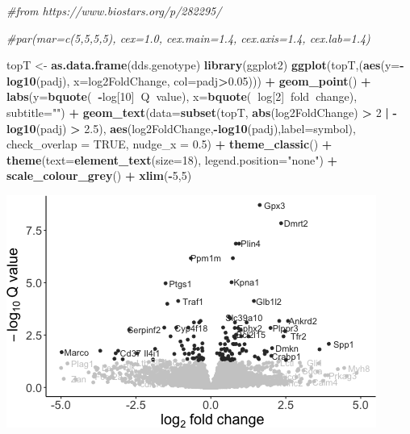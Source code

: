 \documentclass[]{article}
\newenvironment{Shaded}{\begin{snugshade}}{\end{snugshade}}
\newcommand{\CommentTok}[1]{\textcolor[rgb]{0.56,0.35,0.01}{\textit{#1}}}
\newcommand{\DataTypeTok}[1]{\textcolor[rgb]{0.13,0.29,0.53}{#1}}
\newcommand{\DecValTok}[1]{\textcolor[rgb]{0.00,0.00,0.81}{#1}}
\newcommand{\FloatTok}[1]{\textcolor[rgb]{0.00,0.00,0.81}{#1}}
\newcommand{\KeywordTok}[1]{\textcolor[rgb]{0.13,0.29,0.53}{\textbf{#1}}}
\newcommand{\NormalTok}[1]{#1}
\newcommand{\OperatorTok}[1]{\textcolor[rgb]{0.81,0.36,0.00}{\textbf{#1}}}
\newcommand{\OtherTok}[1]{\textcolor[rgb]{0.56,0.35,0.01}{#1}}
\newcommand{\StringTok}[1]{\textcolor[rgb]{0.31,0.60,0.02}{#1}}
\begin{document}
\begin{Shaded}
\begin{Highlighting}[]
\CommentTok{#from https://www.biostars.org/p/282295/}

\CommentTok{#par(mar=c(5,5,5,5), cex=1.0, cex.main=1.4, cex.axis=1.4, cex.lab=1.4)}

\NormalTok{topT <-}\StringTok{ }\KeywordTok{as.data.frame}\NormalTok{(dds.genotype)}
\KeywordTok{library}\NormalTok{(ggplot2)}
\KeywordTok{ggplot}\NormalTok{(topT,(}\KeywordTok{aes}\NormalTok{(}\DataTypeTok{y=}\OperatorTok{-}\KeywordTok{log10}\NormalTok{(padj),}
                \DataTypeTok{x=}\NormalTok{log2FoldChange,}
                \DataTypeTok{col=}\NormalTok{padj}\OperatorTok{>}\FloatTok{0.05}\NormalTok{))) }\OperatorTok{+}
\StringTok{  }\KeywordTok{geom_point}\NormalTok{() }\OperatorTok{+}
\StringTok{  }\KeywordTok{labs}\NormalTok{(}\DataTypeTok{y=}\KeywordTok{bquote}\NormalTok{(}\OperatorTok{~-}\NormalTok{log[}\DecValTok{10}\NormalTok{]}\OperatorTok{~}\NormalTok{Q}\OperatorTok{~}\NormalTok{value),}
       \DataTypeTok{x=}\KeywordTok{bquote}\NormalTok{(}\OperatorTok{~}\NormalTok{log[}\DecValTok{2}\NormalTok{]}\OperatorTok{~}\NormalTok{fold}\OperatorTok{~}\NormalTok{change),}
       \DataTypeTok{subtitle=}\StringTok{""}\NormalTok{) }\OperatorTok{+}
\StringTok{    }\KeywordTok{geom_text}\NormalTok{(}\DataTypeTok{data=}\KeywordTok{subset}\NormalTok{(topT, }\KeywordTok{abs}\NormalTok{(log2FoldChange) }\OperatorTok{>}\StringTok{ }\DecValTok{2} \OperatorTok{|}\StringTok{ }\OperatorTok{-}\KeywordTok{log10}\NormalTok{(padj) }\OperatorTok{>}\StringTok{ }\FloatTok{2.5}\NormalTok{),}
            \KeywordTok{aes}\NormalTok{(log2FoldChange,}\OperatorTok{-}\KeywordTok{log10}\NormalTok{(padj),}\DataTypeTok{label=}\NormalTok{symbol),}
            \DataTypeTok{check_overlap =} \OtherTok{TRUE}\NormalTok{, }\DataTypeTok{nudge_x =} \FloatTok{0.5}\NormalTok{) }\OperatorTok{+}
\StringTok{  }\KeywordTok{theme_classic}\NormalTok{() }\OperatorTok{+}
\StringTok{  }\KeywordTok{theme}\NormalTok{(}\DataTypeTok{text=}\KeywordTok{element_text}\NormalTok{(}\DataTypeTok{size=}\DecValTok{18}\NormalTok{),}
        \DataTypeTok{legend.position=}\StringTok{"none"}\NormalTok{) }\OperatorTok{+}
\StringTok{  }\KeywordTok{scale_colour_grey}\NormalTok{() }\OperatorTok{+}
\StringTok{  }\KeywordTok{xlim}\NormalTok{(}\OperatorTok{-}\DecValTok{5}\NormalTok{,}\DecValTok{5}\NormalTok{)}
\end{Highlighting}
\end{Shaded}

\includegraphics{figures-noura/volcano-plot-1.png}
\end{document}
